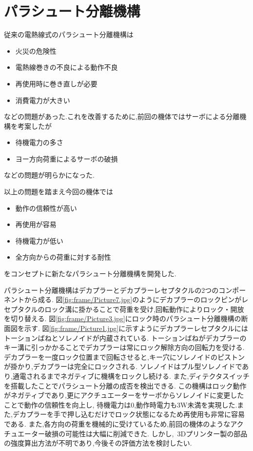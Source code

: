 \section{パラシュート分離機構}
従来の電熱線式のパラシュート分離機構は
\begin{itemize}
  \item 火災の危険性
  \item 電熱線巻きの不良による動作不良
  \item 再使用時に巻き直しが必要
  \item 消費電力が大きい
\end{itemize}
などの問題があった.これを改善するために,前回の機体ではサーボによる分離機構を考案したが
\begin{itemize}
  \item 待機電力の多さ
  \item ヨー方向荷重によるサーボの破損
\end{itemize}
などの問題が明らかになった.

以上の問題を踏まえ今回の機体では
\begin{itemize}
  \item 動作の信頼性が高い
  \item 再使用が容易
  \item 待機電力が低い
  \item 全方向からの荷重に対する耐性
\end{itemize}
をコンセプトに新たなパラシュート分離機構を開発した.

パラシュート分離機構はデカプラーとデカプラーレセプタクルの2つのコンポーネントから成る.
\newpage
{}
図\ref{fig:frame/Picture7.jpg}のようにデカプラーのロックピンがレセプタクルのロック溝に掛かることで荷重を受け,回転動作によりロック・開放を切り替える.
図\ref{fig:frame/Picture3.jpg}にロック時のパラシュート分離機構の断面図を示す.
図\ref{fig:frame/Picture1.jpg}に示すようにデカプラーレセプタクルにはトーションばねとソレノイドが内蔵されている.
トーションばねがデカプラーのキー溝に引っかかることでデカプラーは常にロック解除方向の回転力を受ける.
デカプラーを一度ロック位置まで回転させると,キー穴にソレノイドのピストンが掛かり,デカプラーは完全にロックされる.
ソレノイドはプル型ソレノイドであり,通電されるまでネガティブに機構をロックし続ける.
また,ディテクタスイッチを搭載したことでパラシュート分離の成否を検出できる.
この機構はロック動作がネガティブであり,更にアクチュエーターをサーボからソレノイドに変更したことで動作の信頼性を向上し,
待機電力は0,動作時電力も3\si{\watt}未満を実現した.また,デカプラーを手で押し込むだけでロック状態になるため再使用も非常に容易である.
また,各方向の荷重を機械的に受けているため,前回の機体のようなアクチュエーター破損の可能性は大幅に削減できた.
しかし,\ 3Dプリンター製の部品の強度算出方法が不明であり,今後その評価方法を検討したい.

